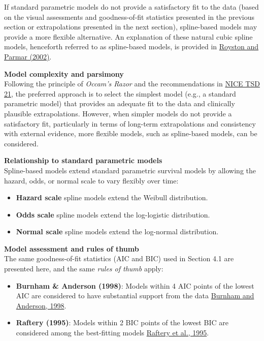 \documentclass[
]{article}
\providecommand{\tightlist}{%
  \setlength{\itemsep}{0pt}\setlength{\parskip}{0pt}}
\begin{document}
If standard parametric models do not provide a satisfactory fit to the
data (based on the visual assessments and goodness-of-fit statistics
presented in the previous section or extrapolations presented in the
next section), spline-based models may provide a more flexible
alternative. An explanation of these natural cubic spline models,
henceforth referred to as spline-based models, is provided in
\href{https://doi.org/10.1002/sim.1203}{Royston and Parmar (2002)}.

\textbf{Model complexity and parsimony}\\
Following the principle of \emph{Occam's Razor} and the recommendations
in
\href{https://www.sheffield.ac.uk/media/34188/download?attachment}{NICE
TSD 21}, the preferred approach is to select the simplest model (e.g., a
standard parametric model) that provides an adequate fit to the data and
clinically plausible extrapolations. However, when simpler models do not
provide a satisfactory fit, particularly in terms of long-term
extrapolations and consistency with external evidence, more flexible
models, such as spline-based models, can be considered.

\textbf{Relationship to standard parametric models}\\
Spline-based models extend standard parametric survival models by
allowing the hazard, odds, or normal scale to vary flexibly over time:

\begin{itemize}
\tightlist
\item
  \textbf{Hazard scale} spline models extend the Weibull distribution.\\
\item
  \textbf{Odds scale} spline models extend the log-logistic
  distribution.\\
\item
  \textbf{Normal scale} spline models extend the log-normal
  distribution.
\end{itemize}

\textbf{Model assessment and rules of thumb}\\
The same goodness-of-fit statistics (AIC and BIC) used in Section 4.1
are presented here, and the same \emph{rules of thumb} apply:

\begin{itemize}
\tightlist
\item
  \textbf{Burnham \& Anderson (1998)}: Models within 4 AIC points of the
  lowest AIC are considered to have substantial support from the data
  \href{https://doi.org/10.1007/978-1-4757-2917-7}{Burnham and Anderson,
  1998}.\\
\item
  \textbf{Raftery (1995)}: Models within 2 BIC points of the lowest BIC
  are considered among the best-fitting models
  \href{https://doi.org/10.2307/271063}{Raftery et al., 1995}.
\end{itemize}
\end{document}
